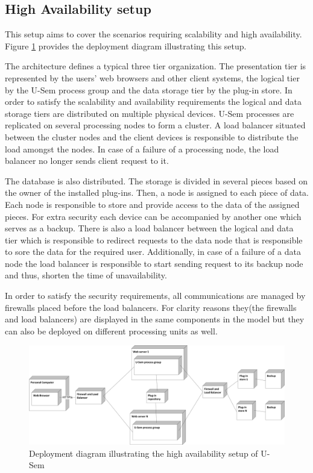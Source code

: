 \subsection{High Availability setup} 

This setup aims to cover the scenarios requiring scalability and high availability. Figure \ref{high_avail} provides the deployment diagram illustrating this setup.

The architecture defines a typical three tier organization. The presentation tier is represented by the users' web browsers and other client systems, the logical tier by the U-Sem process group and the data storage tier by the plug-in store. In order to satisfy the scalability and availability requirements the logical and data storage tiers are distributed on multiple physical
devices. U-Sem processes are replicated on several processing nodes to form a cluster. A load balancer situated between the cluster nodes and the client devices is responsible to distribute the load amongst the nodes. In case of a failure of a processing node, the load balancer no longer sends client request to it.

The database is also distributed. The storage is divided in several pieces based on the owner of the installed plug-ins. Then, a node is assigned to each piece of data. Each node is responsible to store and provide access to the data of the assigned pieces. For extra security each device can be accompanied by another one which serves as a backup. There is also a load balancer between the logical and data tier which is responsible to redirect requests to the data node that is responsible to sore the data for the required user. Additionally, in case of a failure of a data node the load balancer is responsible to start sending request to its backup node and thus, shorten the time of unavailability.

In order to satisfy the security requirements, all communications are managed by firewalls placed before the load balancers. For clarity reasons they(the firewalls and load balancers) are displayed in the same components in the model but they can also be deployed on different processing units as well.


\begin{figure}[h!]
  \centering
  	\includegraphics[scale=0.7,angle=90]{plug-in/layers/high_setup.png}
  \caption{Deployment diagram illustrating the high availability setup of U-Sem}
  \label{high_avail}
\end{figure}

